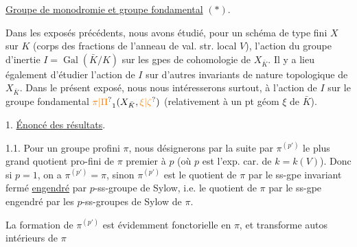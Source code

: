  \uline{Groupe de monodromie et groupe fondamental} $(*)$.

 Dans les exposés précédents, nous avons étudié,  pour un schéma de type fini $X$ sur $K$ (corps des fractions de l'anneau de val.  str. local $V$), l'action du groupe d'inertie $I=\operatorname{Gal}(\bar K/K)$ sur les gpes de cohomologie de $X_{\bar K}$. Il y a lieu également d'étudier l'action de $I$ sur  d'autres invariants de nature topologique  de $X_{\bar K}$. Dans le présent exposé, nous nous intéresserons surtout, à l'action de $I$ sur le groupe fondamental ${\unsure{\pi|\Pi}}_1(X_{\bar K},\unsure{\xi|\zeta})$ (relativement à un pt géom $\xi$ de $\bar K$). 

1. \uline{Énoncé des résultats}.

1.1. Pour un groupe profini $\pi$, nous désignerons par la suite par $\pi^{(p')}$ le plus grand quotient pro-fini de $\pi$ premier à $p$  (où $p$ est l'exp. car. de $k=k(V)$). Donc si $p=1$,  on a $\pi^{(p')}=\pi$, sinon $\pi^{(p')}$ est le quotient de $\pi$ par le ss-gpe invariant fermé \uline{engendré} par  $p$-ss-groupe de Sylow, i.e. le quotient de $\pi$ par le ss-gpe engendré par les $p$-ss-groupes de Sylow de $\pi$.

La formation de $\pi^{(p')}$ est évidemment fonctorielle en $\pi$, et transforme autos intérieurs de $\pi$
